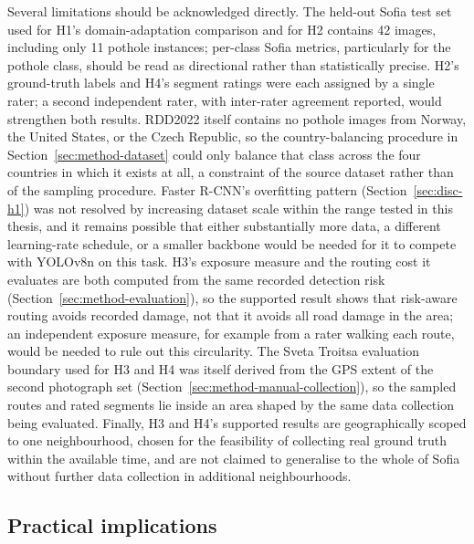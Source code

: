\documentclass[10pt,a4paper,twocolumn]{article}
\begin{document}
Several limitations should be acknowledged directly. The held-out Sofia
test set used for H1's domain-adaptation comparison and for H2 contains
42 images, including only 11 pothole instances; per-class Sofia metrics,
particularly for the pothole class, should be read as directional rather
than statistically precise. H2's ground-truth labels and H4's segment
ratings were each assigned by a single rater; a second independent rater,
with inter-rater agreement reported, would strengthen both results.
RDD2022 itself contains no pothole images from Norway, the United States,
or the Czech Republic, so the country-balancing procedure in
Section~\ref{sec:method-dataset} could only balance that class across the
four countries in which it exists at all, a constraint of the source
dataset rather than of the sampling procedure. Faster R-CNN's overfitting
pattern (Section~\ref{sec:disc-h1}) was not resolved by increasing
dataset scale within the range tested in this thesis, and it remains
possible that either substantially more data, a different learning-rate
schedule, or a smaller backbone would be needed for it to compete with
YOLOv8n on this task. H3's exposure measure and the routing cost it evaluates are both computed
from the same recorded detection risk (Section~\ref{sec:method-evaluation}),
so the supported result shows that risk-aware routing avoids recorded
damage, not that it avoids all road damage in the area; an independent
exposure measure, for example from a rater walking each route, would be
needed to rule out this circularity. The Sveta Troitsa evaluation boundary
used for H3 and H4 was itself derived from the GPS extent of the second
photograph set (Section~\ref{sec:method-manual-collection}), so the sampled
routes and rated segments lie inside an area shaped by the same data
collection being evaluated. Finally, H3 and H4's supported results are
geographically scoped to one neighbourhood, chosen for the feasibility of
collecting real ground truth within the available time, and are not
claimed to generalise to the whole of Sofia without further data
collection in additional neighbourhoods.

\subsection{Practical implications}
\label{sec:disc-implications}
\end{document}
